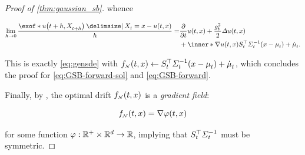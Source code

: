 \begin{proof}[Proof of \cref{thm:gaussian_sb}]
whence 

\begin{align}
\nn
\lim_{ h\to 0}  \frac{  \exof*{ \testf[\ctime+h][\Xsol[\ctime+h]] \given \Xsol = x }  - \testf  }{h} = &\frac{\del}{\del \ctime} \testf +  \frac{\volatsq[\ctime]}{2} \Laplace \testf \\
 &+  \inner*{  \nabla \testf }{ \St^\top \Sigmasolinv\parens*{ \point - \meansol  } + \dmeansol  }.
\end{align}

This is exactly \eqref{eq:gensde} with $\GSBf \subs \St^\top \Sigmasolinv\parens*{ \point - \meansol  } + \dmeansol$, which concludes the proof for \eqref{eq:GSB-forward-sol} and \eqref{eq:GSB-forward}.

Finally, by \cite[(4.2)]{leonard2013survey}, the optimal drift $\GSBf$ is a \emph{gradient field}: 

\begin{equation}
\GSBf = \nabla \varphi(\ctime,\point)
\end{equation}

for some function $\varphi: \mathbb{R}^+ \times \mathbb{R}^d \to \mathbb{R}$, implying that $S_{t}^\top\Sigma^{-1}_{ t }$ must be symmetric.
\end{proof}

